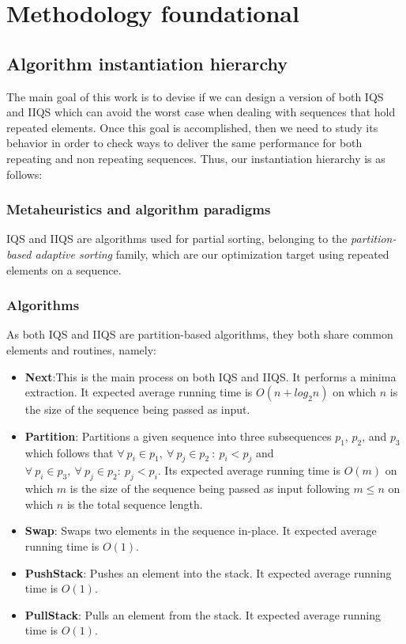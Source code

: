 \section{Methodology foundational}
\label{SECTION:METHODOLOGY_FOUNDATIONALS}

\subsection{Algorithm instantiation hierarchy}
The main goal of this work is to devise if we can design a version of both IQS and IIQS which can avoid the worst case when dealing with sequences that hold repeated elements. Once this goal is accomplished, then we need to study its behavior in order to check ways to deliver the same performance for both repeating and non repeating sequences. Thus, our instantiation hierarchy is as follows:\\

\subsubsection{Metaheuristics and algorithm paradigms}
IQS and IIQS are algorithms used for partial sorting, belonging to the \textit{partition-based adaptive sorting} family, which are our optimization target using repeated elements on a sequence.\\

\subsubsection{Algorithms}
As both IQS and IIQS are partition-based algorithms, they both share common elements and routines, namely:\\

\begin{itemize}
    \item \textbf{Next}:This is the main process on both IQS and IIQS. It performs a minima extraction. It expected average running time is $O(n + log_2{n})$ on which $n$ is the size of the sequence being passed as input.
    \item \textbf{Partition}: Partitions a given sequence into three subsequences $p_1$, $p_2$, and $p_3$ which follows that $\forall~p_i \in p_1,~\forall~p_j \in p_2~:~ p_i < p_j$ and $\forall~p_i \in p_3,~\forall~p_j \in p_2:~p_j < p_i$. Its expected average running time is $O(m)$ on which $m$ is the size of the sequence being passed as input following $m \leq n$ on which $n$ is the total sequence length.
    \item \textbf{Swap}: Swaps two elements in the sequence in-place. It expected average running time is $O(1)$.
    \item \textbf{PushStack}: Pushes an element into the stack. It expected average running time is $O(1)$.
    \item \textbf{PullStack}: Pulls an element from the stack. It expected average running time is $O(1)$.
\end{itemize}

